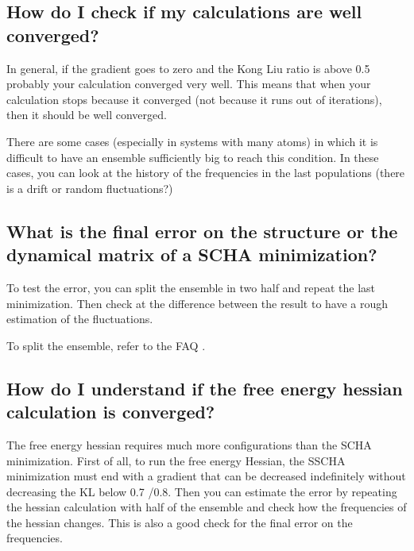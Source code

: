 \documentclass[a4paper,11pt,english]{sphinxmanual}
\begin{document}
\subsection{How do I check if my calculations are well converged?}
\label{\detokenize{faq:how-do-i-check-if-my-calculations-are-well-converged}}
\sphinxAtStartPar
In general, if the gradient goes to zero and the Kong Liu ratio is above 0.5 probably your calculation converged very well. This means that when your calculation stops because it converged (not because it runs out of iterations), then it should be well converged.

\sphinxAtStartPar
There are some cases (especially in systems with many atoms) in which it is difficult to have an ensemble sufficiently big to reach this condition.
In these cases, you can look at the history of the frequencies in the last populations (there is a drift or random fluctuations?)


\subsection{What is the final error on the structure or the dynamical matrix of a SCHA minimization?}
\label{\detokenize{faq:what-is-the-final-error-on-the-structure-or-the-dynamical-matrix-of-a-scha-minimization}}
\sphinxAtStartPar
To test the error, you can split the ensemble in two half and repeat the last minimization.
Then check at the difference between the result to have a rough estimation of the fluctuations.

\sphinxAtStartPar
To split the ensemble, refer to the FAQ {\hyperref[\detokenize{faq:faq-split}]{}}.


\subsection{How do I understand if the free energy hessian calculation is converged?}
\label{\detokenize{faq:how-do-i-understand-if-the-free-energy-hessian-calculation-is-converged}}
\sphinxAtStartPar
The free energy hessian requires much more configurations than the SCHA minimization. First of all, to run the free energy Hessian, the SSCHA minimization must end with a gradient that can be decreased indefinitely without decreasing the KL below 0.7 /0.8.
Then you can estimate the error by repeating the hessian calculation with half of the ensemble and check how the frequencies of the hessian changes. This is also a good check for the final error on the frequencies.
\end{document}
